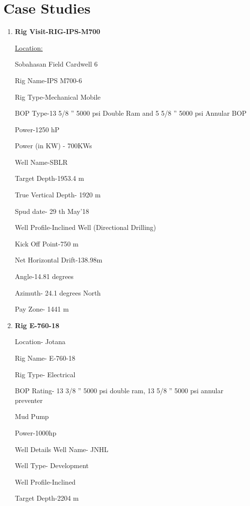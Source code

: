 \chapter{Case Studies}


\begin{enumerate}



\item \textbf{Rig Visit-RIG-IPS-M700}

\underline{Location:} 

Sobahasan Field Cardwell 6

Rig Name-IPS M700-6

Rig Type-Mechanical Mobile

BOP Type-13 5/8 ” 5000 psi Double Ram and 5 5/8 ” 5000 psi Annular BOP

\vspace{1em}


Power-1250 hP

Power (in KW) - 700KWs

\vspace{1em}


Well Name-SBLR

Target Depth-1953.4 m

True Vertical Depth- 1920 m

Spud date- 29 th May’18

Well Profile-Inclined Well (Directional Drilling)

Kick Off Point-750 m

Net Horizontal Drift-138.98m

Angle-14.81 degrees

Azimuth- 24.1 degrees North

Pay Zone- 1441 m



\item \textbf{Rig E-760-18}


Location- Jotana

Rig Name- E-760-18

Rig Type- Electrical

BOP Rating- 13 3/8 ” 5000 psi double ram, 13 5/8 ” 5000 psi annular preventer

Mud Pump

Power-1000hp

Well Details
Well Name- JNHL

Well Type- Development

Well Profile-Inclined

Target Depth-2204 m

\end{enumerate}


 
